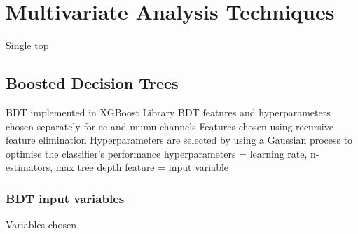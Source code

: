 \section{Multivariate Analysis Techniques}\label{sec:mvas}
Single top 
\subsection{Boosted Decision Trees}\label{subsec:bdt}

BDT implemented in XGBoost Library
BDT features and hyperparameters chosen separately for ee and mumu channels
Features chosen using recursive feature elimination
Hyperparameters are selected by using a Gaussian process to optimise the classifier’s performance
hyperparameters = learning rate, n-estimators, max tree depth
feature = input variable

\subsubsection{BDT input variables}
Variables chosen

